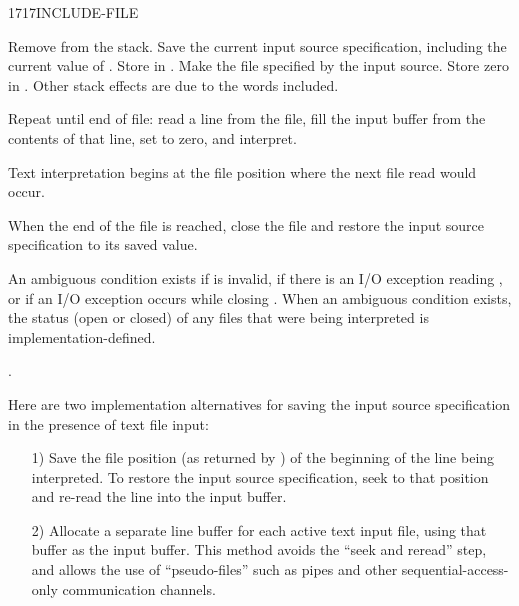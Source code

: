 \begin{worddef}{1717}{INCLUDE-FILE}
\item {}

	Remove  from the stack. Save the current input
	source specification, including the current value of
	. Store  in .
	Make the file specified by  the input source. Store
	zero in . Other stack effects are due to the
	words included.

	Repeat until end of file: read a line from the file, fill the
	input buffer from the contents of that line, set 
	to zero, and interpret.

	Text interpretation begins at the file position where the next
	file read would occur.

	When the end of the file is reached, close the file and restore
	the input source specification to its saved value.

	An ambiguous condition exists if  is invalid, if
	there is an I/O exception reading , or if an I/O
	exception occurs while closing . When an ambiguous
	condition exists, the status (open or closed) of any files that
	were being interpreted is implementation-defined.

\see {}%
	.

	\begin{rationale} %
		Here are two implementation alternatives for saving the input
		source specification in the presence of text file input:

		\begin{enumerate}
		\item[1)] Save the file position (as returned by
			) of the beginning of the line being
			interpreted. To restore the input source specification,
			seek to that position and re-read the line into the input
			buffer.

		\item[2)] Allocate a separate line buffer for each active text
			input file, using that buffer as the input buffer. This
			method avoids the ``seek and reread'' step, and allows the
			use of ``pseudo-files'' such as pipes and other
			sequential-access-only communication channels.
		\end{enumerate}
	\end{rationale}
\end{worddef}


